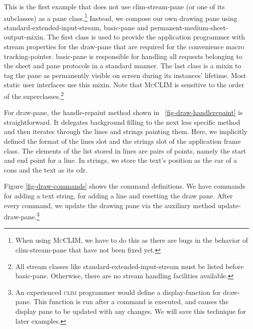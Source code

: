 \documentclass[twocolumn,a4paper]{article}
\newcommand {\code}[1]{{\sffamily #1}}
\newcommand {\CLIM}{\textsc{clim}}
\newcommand {\mcclim}{\textsc{McCLIM}}
\let\class\code
\let\method\code
\let\constant\code
\let\macro\code
\let\keyword\code
\begin{document}
This is the first example that does not use \class{clim-stream-pane}
(or one of its subclasses) as a pane class.\footnote{When using \mcclim{},
we have to do this as there are bugs in the behavior of
\class{clim-stream-pane} that have not been fixed yet.} Instead, we
compose our own drawing pane using
\class{standard-extended-input-stream}, \class{basic-pane} and
\class{permanent-medium-sheet-output-mixin}. The first class is used
to provide the application programmer with stream properties for the
draw-pane that are required for the convenience macro
\macro{tracking-pointer}. \class{basic-pane} is responsible for
handling all requests belonging to the sheet and pane protocols in a
standard manner. The last class is a mixin to tag the pane as
permanently visible on screen during its instances' lifetime. Most
static user interfaces use this mixin. Note that \mcclim{} is sensitive
to the order of the superclasses.\footnote{All stream classes like
\class{standard-extended-input-stream} must be listed before
\class{basic-pane}. Otherwise, there are no stream handling facilities
available.}

For \class{draw-pane}, the \method{handle-repaint} method shown in
\figurename~\ref{fig-draw-handlerepaint} is straightforward. It
delegates background filling to the next less specific method and then
iterates through the lines and strings painting them. Here, we
implicitly defined the format of the \code{lines} slot and the
\code{strings} slot of the application frame class. The elements of
the list stored in \code{lines} are pairs of points, namely the start
and end point for a line. In \code{strings}, we store the text's
position as the \code{car} of a cons and the text as its \code{cdr}.



Figure \ref{fig-draw-commands} shows the command definitions. We have
commands for adding a text string, for adding a line and resetting the
draw pane. After every command, we update the drawing pane via the
auxiliary method \method{update-draw-pane}.\footnote{An experienced
\CLIM{} programmer would define a display-function for
\class{draw-pane}. This function is run after a command is
executed, and causes the display pane to be updated with any changes. We 
will save this technique for later examples.}
\end{document}
